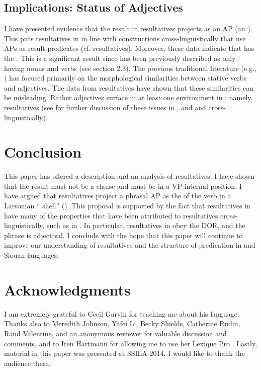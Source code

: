 \documentclass[output=paper]{LSP/langsci}
\begin{document}
\subsection{Implications: Status of Adjectives}

I have presented evidence that the result  in  resultatives projects as an AP (an ). This puts resultatives in  in line with  constructions cross-linguistically that use APs as result predicates (cf.  resultatives). Moreover, these data indicate that  has the  . This is a significant result since  has been previously described as only having nouns and verbs (see section 2.3). The previous traditional literature (e.g., \citealt{Helmbrecht2006b}) has focused primarily on the morphological similarities between stative verbs and adjectives. The data from resultatives have shown that these similarities can be misleading. Rather adjectives surface in at least one environment in ; namely, resultatives (see \citealt{Rosen2014,Rosen2015} for further discussion of these issues in , and \citealt{Baker2003} and \citealt{Dixon2004} cross-linguistically).

\section{Conclusion}\label{sec:rosen:6}
This paper has offered a description and an analysis of  resultatives. I have shown that the result  must not be a clause and must be in a VP-internal position. I have argued that  resultatives project a phrasal AP as the  of the verb in a Larsonian `` shell'' (\citealt{Larson1988}). This proposal is supported by the fact that resultatives in  have many of the properties that have been attributed to resultatives cross-linguistically, such as in . In particular, resultatives in  obey the DOR, and the  phrase is adjectival. I conclude with the hope that this paper will continue to improve our understanding of resultatives and the structure of predication in  and Siouan languages.

\section* {Acknowledgments}
I am extremely grateful to Cecil Garvin for teaching me about his language. Thanks also to Meredith Johnson, Yafei Li, Becky Shields, Catherine Rudin, Rand Valentine, and an anonymous reviewer for valuable discussion and comments, and to Iren Hartmann for allowing me to use her Lexique Pro . Lastly, material in this paper was presented at SSILA 2014. I would like to thank the audience there.
\end{document}
